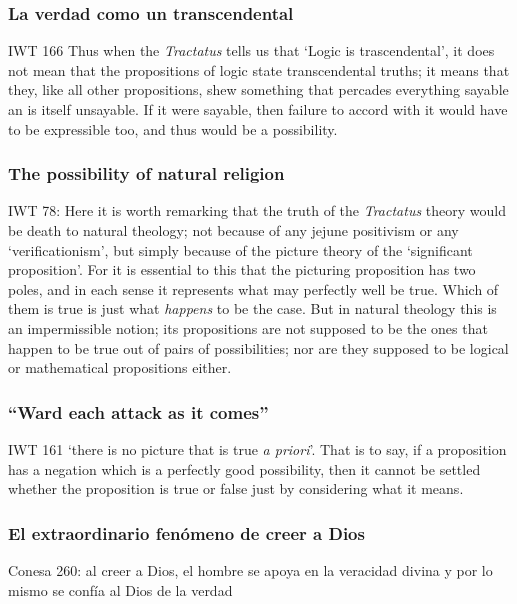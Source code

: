 \subsubsection{La verdad como un transcendental}

IWT 166 Thus when the \emph{Tractatus} tells us that `Logic is trascendental', it does not mean that the propositions of logic state transcendental truths; it means that they, like all other propositions, shew something that percades everything sayable an is itself unsayable. If it were sayable, then failure to accord with it would have to be expressible too, and thus would be a possibility.

\subsubsection{The possibility of natural religion}

IWT 78: Here it is worth remarking that the truth of the \emph{Tractatus} theory would be death to natural theology; not because of any jejune positivism or any `verificationism', but simply because of the picture theory of the `significant proposition'. For it is essential to this that the picturing proposition has two poles, and in each sense it represents what may perfectly well be true. Which of them is true is just what \emph{happens} to be the case. But in natural theology this is an impermissible notion; its propositions are not supposed to be the ones that happen to be true out of pairs of possibilities; nor are they supposed to be logical or mathematical propositions either.

\subsubsection{``Ward each attack as it comes''}

IWT 161 `there is no picture that is true \emph{a priori}'. That is to say, if a proposition has a negation which is a perfectly good possibility, then it cannot be settled whether the proposition is true or false just by considering what it means.

\subsubsection{El extraordinario fenómeno de creer a Dios}

Conesa 260: al creer a Dios, el hombre se apoya en la veracidad divina  y por lo mismo se confía al Dios de la verdad

